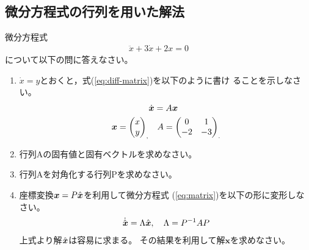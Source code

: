 \documentclass[twocolumn,11pt]{jarticle}
\begin{document}
\subsection{微分方程式の行列を用いた解法}
微分方程式
\begin{align}
  \label{eq:diff-matrix}
  \ddot{x}+3\dot{x}+2x=0
\end{align}
について以下の問に答えなさい。
\begin{enumerate}
\item $\dot{x}=y$とおくと，式(\ref{eq:diff-matrix})を以下のように書け
  ることを示しなさい。
  \begin{align}
    \label{eq:matrix}
    &\dot{\boldsymbol{x}}=A\boldsymbol{x}\\
    \boldsymbol{x}=
    \begin{pmatrix}
      x \\ y
    \end{pmatrix}_,& \quad
    A= \begin{pmatrix}
      0 & 1 \\
      -2 & -3
    \end{pmatrix}_.\notag
  \end{align}
\item 行列Aの固有値と固有ベクトルを求めなさい。
\item 行列Aを対角化する行列Pを求めなさい。
\item 
  座標変換$\boldsymbol{x}=P\hat{\boldsymbol{x}}$を利用して微分方程式
  (\ref{eq:matrix})を以下の形に変形しなさい。
  \begin{align}
    \dot{\hat{\boldsymbol{x}}}=\Lambda\hat{\boldsymbol{x}},\quad
    \Lambda=P^{-1}AP\notag
  \end{align}
  上式より解$\hat{\boldsymbol{x}}$は容易に求まる。
  その結果を利用して解$\boldsymbol{x}$を求めなさい。
\end{enumerate}

\end{document}
